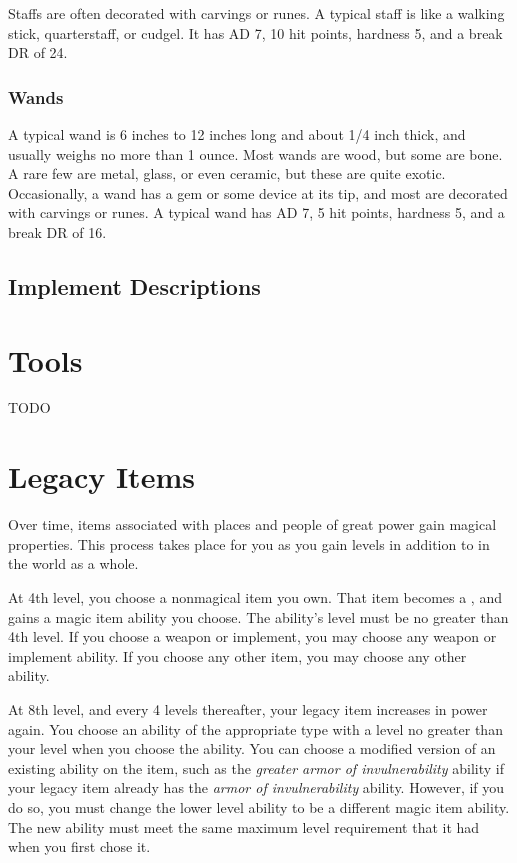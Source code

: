             Staffs are often decorated with carvings or runes.
            A typical staff is like a walking stick, quarterstaff, or cudgel.
            It has AD 7, 10 hit points, hardness 5, and a break DR of 24.

        \subsubsection{Wands}

             A typical wand is 6 inches to 12 inches long and about 1/4 inch thick, and usually weighs no more than 1 ounce.
            Most wands are wood, but some are bone.
            A rare few are metal, glass, or even ceramic, but these are quite exotic.
            Occasionally, a wand has a gem or some device at its tip, and most are decorated with carvings or runes.
            A typical wand has AD 7, 5 hit points, hardness 5, and a break DR of 16.

    \subsection{Implement Descriptions}

        

\section{Tools}

    TODO

\section{Legacy Items}\label{Legacy Items}

    Over time, items associated with places and people of great power gain magical properties.
    This process takes place for you as you gain levels in addition to in the world as a whole.

    At 4th level, you choose a nonmagical item you own.
    That item becomes a , and gains a magic item ability you choose.
    The ability's level must be no greater than 4th level.
    If you choose a weapon or implement, you may choose any weapon or implement ability.
    If you choose any other item, you may choose any other ability.

    At 8th level, and every 4 levels thereafter, your legacy item increases in power again.
    You choose an ability of the appropriate type with a level no greater than your level when you choose the ability.
    You can choose a modified version of an existing ability on the item, such as the \textit{greater armor of invulnerability} ability if your legacy item already has the \textit{armor of invulnerability} ability.
    However, if you do so, you must change the lower level ability to be a different magic item ability.
    The new ability must meet the same maximum level requirement that it had when you first chose it.

